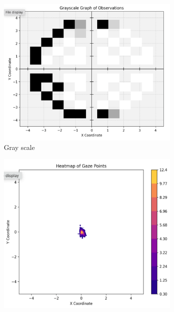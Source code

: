 \documentclass{l4proj}
\begin{document}
\begin{figure}[htbp]
    \centering
    \begin{subfigure}[b]{0.4\textwidth}
        \includegraphics[width=\textwidth]{dissertation/images/participant2_gs_r.png}
        \caption{Gray scale}
        \label{fig:implemented_gs}
    \end{subfigure}
    \hfill
    \begin{subfigure}[b]{0.4\textwidth}
        \includegraphics[width=\textwidth]{dissertation/images/participant2_hm_r.png}

\end{subfigure}
\end{figure}
\end{document}
